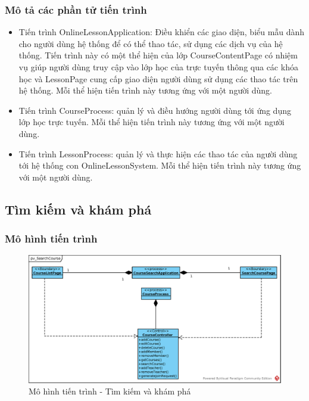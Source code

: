 \documentclass[./../main.tex]{subfiles}
\begin{document}
\subsubsection{Mô tả các phần tử tiến trình}
\begin{itemize}
	\item Tiến trình OnlineLessonApplication: Điều khiển các giao diện, biểu mẫu dành cho người dùng hệ thống để có thể thao tác, sử dụng các dịch vụ của hệ thống. Tiến trình này có một thể hiện của lớp CourseContentPage có nhiệm vụ giúp người dùng truy cập vào lớp học của trực tuyến thông qua các khóa học và LessonPage cung cấp giao diện người dùng sử dụng các thao tác trên hệ thống.
	Mỗi thể hiện tiến trình này tương ứng với một người dùng.
	\item Tiến trình CourseProcess: quản lý và điều hướng người dùng tới ứng dụng lớp học trực tuyến.
	Mỗi thể hiện tiến trình này tương ứng với một người dùng.
	\item Tiến trình LessonProcess: quản lý và thực hiện các thao tác của người dùng tới  hệ thống con OnlineLessonSystem.
	Mỗi thể hiện tiến trình này tương ứng với một người dùng.
	
\end{itemize}

\subsection{Tìm kiếm và khám phá}

\subsubsection{Mô hình tiến trình}

\begin{figure}[H]
	\centering
	\includegraphics[width=\linewidth]{./images/pv_SearchCourse.eps}
	\caption{Mô hình tiến trình - Tìm kiếm và khám phá}
\end{figure}
\end{document}
